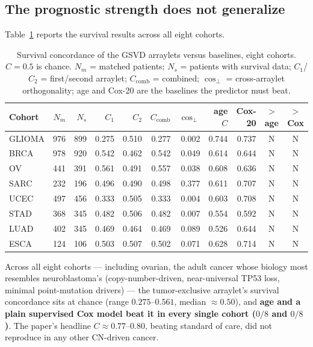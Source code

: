 \documentclass[11pt]{article}
\newcommand{\C}{\textit{C}}
\begin{document}
\subsection{The prognostic strength does not generalize}
Table~\ref{tab:main} reports the survival results across all eight cohorts.

\begin{table}[h]
\centering
\small
\caption{Survival concordance of the GSVD arraylets versus baselines, eight
cohorts. $\C=0.5$ is chance. $N_m$ = matched patients; $N_s$ = patients with
survival data; $\C_1$/$\C_2$ = first/second arraylet; $\C_{\text{comb}}$ =
combined; $\cos_\perp$ = cross-arraylet orthogonality; age and Cox-20 are the
baselines the predictor must beat.}
\label{tab:main}
\begin{tabular}{@{}lrrrrrrrrcc@{}}
\toprule
Cohort & $N_m$ & $N_s$ & $\C_1$ & $\C_2$ & $\C_{\text{comb}}$ & $\cos_\perp$ & age $\C$ & Cox-20 & $>$age & $>$Cox \\
\midrule
GLIOMA & 976 & 899 & 0.275 & 0.510 & 0.277 & 0.002 & 0.744 & 0.737 & N & N \\
BRCA   & 978 & 920 & 0.542 & 0.462 & 0.542 & 0.049 & 0.614 & 0.644 & N & N \\
OV     & 441 & 391 & 0.561 & 0.491 & 0.557 & 0.038 & 0.608 & 0.636 & N & N \\
SARC   & 232 & 196 & 0.496 & 0.490 & 0.498 & 0.377 & 0.611 & 0.707 & N & N \\
UCEC   & 497 & 456 & 0.333 & 0.505 & 0.333 & 0.004 & 0.603 & 0.708 & N & N \\
STAD   & 368 & 345 & 0.482 & 0.506 & 0.482 & 0.007 & 0.554 & 0.592 & N & N \\
LUAD   & 402 & 345 & 0.469 & 0.464 & 0.469 & 0.089 & 0.526 & 0.644 & N & N \\
ESCA   & 124 & 106 & 0.503 & 0.507 & 0.502 & 0.071 & 0.628 & 0.714 & N & N \\
\bottomrule
\end{tabular}
\end{table}

Across all eight cohorts --- including ovarian, the adult cancer whose biology
most resembles neuroblastoma's (copy-number-driven, near-universal TP53 loss,
minimal point-mutation drivers) --- the tumor-exclusive arraylet's survival
concordance sits at chance (range $0.275$--$0.561$, median $\approx0.50$), and
\textbf{age and a plain supervised Cox model beat it in every single cohort
($0/8$ and $0/8$)}. The paper's headline $\C\approx0.77$--$0.80$, beating
standard of care, did not reproduce in any other CN-driven cancer.
\end{document}
